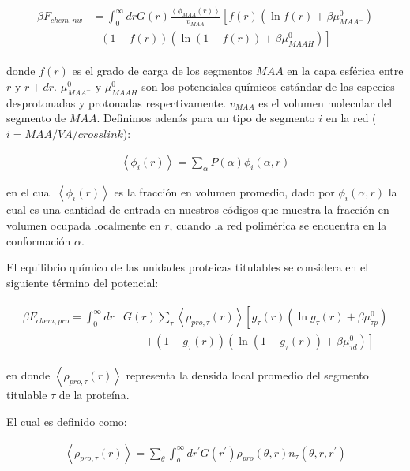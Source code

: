 \begin{align}
	\begin{aligned}
		\beta F_{chem,nw} &= \int_0^\infty drG(r) \frac{\left<\phi_{MAA}(r)\right>}{v_{MAA}} \left[f(r)(\ln f(r)+ \beta\mu^0_{MAA^-})\right.\\
		&\left.+(1-f(r))(\ln (1-f(r))+\beta\mu^0_{MAAH})\right]    
	\end{aligned}
\end{align} 


\noindent donde $f(r)$ es el grado de carga de los segmentos $MAA$ en la capa esf\'erica entre $r$ y $r + dr$.
$\mu^0_{MAA^-}$ y $\mu^0_{MAAH}$ son los potenciales qu\'imicos est\'andar de las especies desprotonadas y protonadas respectivamente. $v_{MAA}$ es el volumen molecular del segmento de $MAA$.
Definimos aden\'as para un tipo de segmento $i$ en la red ($i = MAA/VA/crosslink$):
 

\begin{align}
	\left< \phi_i(r)\right> = \sum_\alpha{P(\alpha)\phi_i(\alpha,r)}
\end{align}

\noindent en el cual $\left< \phi_i(r)\right> $ es la fracci\'on en volumen promedio, dado por $\phi_i(\alpha,r)$ la cual es una cantidad de entrada en nuestros c\'odigos que muestra la fracci\'on en volumen ocupada localmente en $r$, cuando la red polim\'erica se encuentra en la conformaci\'on $\alpha$.


El equilibrio qu\'imico de las unidades proteicas titulables se considera en el siguiente t\'ermino del potencial:

\begin{align}
	\begin{aligned}
		\beta F_{chem,pro} =\int_0^\infty dr &G(r) \sum_\tau \left<\rho_{pro,\tau}(r)\right> \left[g_\tau(r)(\ln g_\tau(r)+ \beta\mu^0_{\tau p})\right.\\
		&\qquad\left.+(1-g_\tau(r))(\ln (1-g_\tau(r))+\beta\mu^0_{\tau d})\right]   
	\end{aligned}
\end{align} 

\noindent en donde $\left<\rho_{pro,\tau}(r)\right>$ representa la densida local promedio del segmento titulable $\tau$ de la prote\'ina.

El cual es definido como:

\begin{align}
	\left<\rho_{pro,\tau}(r)\right> = \sum_\theta \int_o^\infty dr^\prime G(r^\prime) \rho_{pro}(\theta,r)n_\tau(\theta,r,r^\prime)
	\label{eq:esf:segments-pro}
\end{align}

